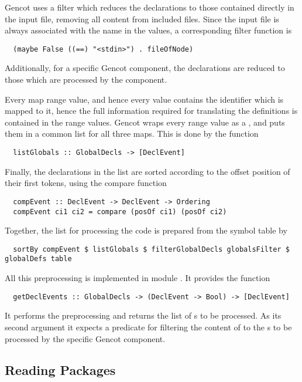 Gencot uses a filter which reduces the declarations to those contained directly in the input file, removing all
content from included files. Since the input file is always associated with the name  in the 
values, a corresponding filter function is
\begin{verbatim}
  (maybe False ((==) "<stdin>") . fileOfNode)
\end{verbatim}
Additionally, for a specific Gencot component, the declarations are reduced to those which are processed by the component. 

Every map range value, and hence every  value contains the identifier which is mapped to it, 
hence the full information required for translating the definitions is contained in the range values. 
Gencot wraps every range value as a , and puts them in a common list for all three maps. This
is done by the function
\begin{verbatim}
  listGlobals :: GlobalDecls -> [DeclEvent]
\end{verbatim}

Finally, the declarations in the list are sorted according to the offset position of their first tokens, using the
compare function
\begin{verbatim}
  compEvent :: DeclEvent -> DeclEvent -> Ordering
  compEvent ci1 ci2 = compare (posOf ci1) (posOf ci2)
\end{verbatim}

Together, the list for processing the code is prepared from the symbol table  by
\begin{verbatim}
  sortBy compEvent $ listGlobals $ filterGlobalDecls globalsFilter $ globalDefs table
\end{verbatim}

All this preprocessing is implemented in module . It provides the function
\begin{verbatim}
  getDeclEvents :: GlobalDecls -> (DeclEvent -> Bool) -> [DeclEvent]
\end{verbatim}
It performs the preprocessing and returns the list of s to be processed.
As its second argument it expects a predicate for filtering the content of  to the
s to be processed by the specific Gencot component.

\subsection{Reading Packages}
\label{impl-ccode-package}


